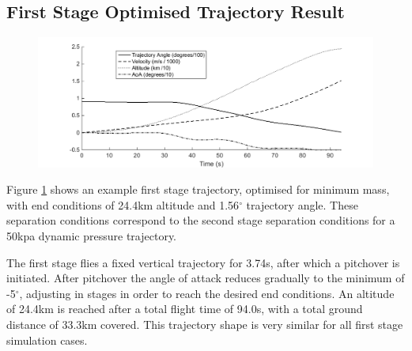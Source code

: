 \subsection{First Stage Optimised Trajectory Result}

\begin{figure}[ht]
	\centering
	\includegraphics[width=1\linewidth]{figures/5_Ascent/FirstStage}
	\caption{}
	\label{fig:FirstStage}
\end{figure}

Figure \ref{fig:FirstStage} shows an example first stage trajectory, optimised for minimum mass, with end conditions of 24.4km altitude and 1.56$^\circ$ trajectory angle. These separation conditions correspond to the second stage separation conditions for a 50kpa dynamic pressure trajectory. 

The first stage flies a fixed vertical trajectory for 3.74s, after which a pitchover is initiated. 
After pitchover the angle of attack reduces gradually to the minimum of -5$^\circ$, adjusting in stages in order to reach the desired end conditions. 
An altitude of 24.4km is reached after a total flight time of 94.0s, with a total ground distance of 33.3km covered. 
This trajectory shape is very similar for all first stage simulation cases. 
